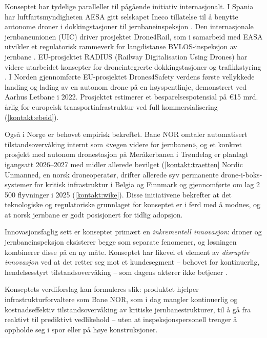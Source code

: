 Konseptet har tydelige paralleller til pågående initiativ internasjonalt. I Spania har luftfartsmyndigheten AESA gitt selskapet Ineco tillatelse til å benytte autonome droner i dokkingstasjoner til jernbaneinspeksjon \parencite{railwaygazette_spain_2024}. Den internasjonale jernbaneunionen (UIC) driver prosjektet Drone4Rail, som i samarbeid med EASA utvikler et regulatorisk rammeverk for langdistanse BVLOS-inspeksjon av jernbane \parencite{uic_drone4rail_2024}. EU-prosjektet RADIUS (Railway Digitalisation Using Drones) har videre utarbeidet konsepter for droneintegrerte dokkingstasjoner og trafikkstyring \parencite{euspa_radius_2024}. I Norden gjennomførte EU-prosjektet Drones4Safety verdens første vellykkede landing og lading av en autonom drone på en høyspentlinje, demonstrert ved Aarhus Letbane i 2022. Prosjektet estimerer et besparelsespotensial på €15 mrd. årlig for europeisk transportinfrastruktur ved full kommersialisering (\cref{kontakt:ebeid}).

Også i Norge er behovet empirisk bekreftet. Bane NOR omtaler automatisert tilstandsovervåking internt som «vegen videre for jernbanen», og et konkret prosjekt med autonom dronestasjon på Meråkerbanen i Trøndelag er planlagt igangsatt 2026--2027 med midler allerede bevilget (\cref{kontakt:traetten} Nordic Unmanned, en norsk droneoperatør, drifter allerede syv permanente drone-i-boks-systemer for kritisk infrastruktur i Belgia og Finnmark og gjennomførte om lag 2\,500 flyvninger i 2025 (\cref{kontakt:wike}). Disse initiativene bekrefter at det teknologiske og regulatoriske grunnlaget for konseptet er i ferd med å modnes, og at norsk jernbane er godt posisjonert for tidlig adopsjon.

Innovasjonsfaglig sett er konseptet primært en \textit{inkrementell innovasjon}: droner og jernbaneinspeksjon eksisterer begge som separate fenomener, og løsningen kombinerer disse på en ny måte. Konseptet har likevel et element av \textit{disruptiv innovasjon} ved at det retter seg mot et kundesegment -- behovet for kontinuerlig, hendelsesstyrt tilstandsovervåking -- som dagens aktører ikke betjener \parencite[]{torvatn_teknologiledelse_2024}.

Konseptets verdiforslag kan formuleres slik: produktet hjelper infrastrukturforvaltere som Bane NOR, som i dag mangler kontinuerlig og kostnadseffektiv tilstandsovervåking av kritiske jernbanestrukturer, til å gå fra reaktivt til prediktivt vedlikehold -- uten at inspeksjonspersonell trenger å oppholde seg i spor eller på høye konstruksjoner.

